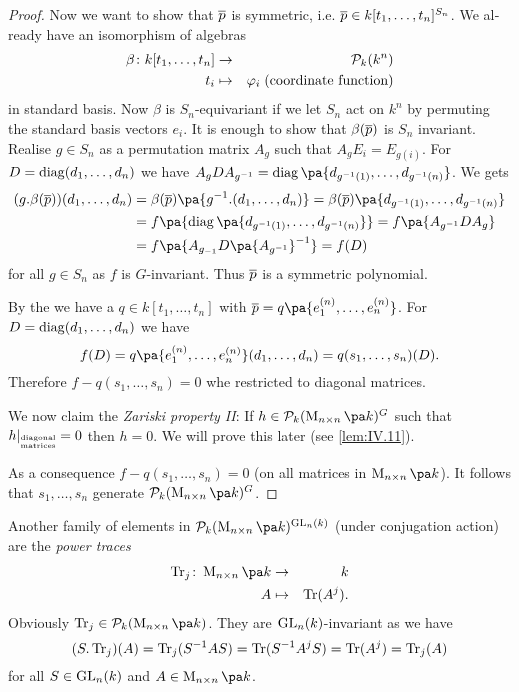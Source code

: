 \documentclass[12pt,a4paper]{scrartcl}
\theoremstyle{cplain}
\theoremstyle{cplain}
\theoremstyle{cplain}
\theoremstyle{definition}
\begin{document}
\begin{otherlanguage}{english}
\begin{proof}
  Now we want to show that $\overline p$ is symmetric, i.e. $\overline p \in k[t_1,\ldots,t_n]^{S_n}$. We already have an isomorphism of algebras
  \begin{eqnarray*}
    \beta\colon k[t_1,\ldots,t_n] &\to& \mathcal{P}_k(k^n) \\
    t_i &\mapsto& \varphi_i\;\text{(coordinate function)}
  \end{eqnarray*}
  in standard basis. Now $\beta$ is $S_n$-equivariant if we let $S_n$ act on $k^n$ by permuting the standard basis vectors $e_i$. It is enough to show that $\beta(\overline p)$ is $S_n$ invariant. Realise $g \in S_n$ as a permutation matrix $A_g$ such that $A_gE_i = E_{g(i)}$. For $D=\operatorname{diag}(d_1,\ldots,d_n)$ we have $A_gDA_{g^{-1}} = \diag\pa{d_{g^{-1}(1)},\ldots,d_{g^{-1}(n)}}$. We gets
  \begin{align*}
    (g.\beta(\ol p))(d_1,\ldots,d_n) &= \beta(\ol p)\pa{g^{-1}.(d_1,\ldots,d_n)} = \beta(\ol p)\pa{d_{g^{-1}(1)},\ldots,d_{g^{-1}(n)}} \\
    &= f\pa{\diag\pa{d_{g^{-1}(1)},\ldots,d_{g^{-1}(n)}}} = f\pa{A_{g^{-1}}DA_g} \\
    &= f\pa{A_{g_{-1}}D\pa{A_{g^{-1}}}^{-1}} = f(D)
  \end{align*}
  for all $g\in S_n$ as $f$ is $G$-invariant. Thus $\overline p$ is a symmetric polynomial.
  
  By the  we have a $q\in k[t_1,\ldots,t_n]$ with $\ol p = q\pa{e_1^{(n)},\ldots,e_n^{(n)}}$. For $D = \operatorname{diag}(d_1,\ldots,d_n)$ we have \[f(D) = q\pa{e_1^{(n)},\ldots,e_n^{(n)}}(d_1,\ldots,d_n) = q(s_1,\ldots,s_n)(D).\] Therefore $f-q(s_1,\ldots,s_n) = 0$ whe restricted to diagonal matrices.
  
  We now claim the \emph{Zariski property II}: If $h\in \Ps_k(\Mat nk)^G$ such that $h|_{\substack{\text{\tiny diagonal}\\\text{\tiny matrices}}} = 0$ then $h = 0$. We will prove this later (see \cref{lem:IV.11}).
  
  As a consequence $f - q(s_1,\ldots,s_n)  = 0$ (on all matrices in $\Mat nk$). It follows that $s_1,\ldots,s_n$ generate $\Ps_k(\Mat nk)^G$.
\end{proof}

Another family of elements in $\Ps_k(\Mat nk)^{\GL_n(k)}$ (under conjugation action) are the \emph{power traces}
\begin{eqnarray*}
  \Tr_j\colon \Mat nk &\to& k \\
  A &\mapsto& \Tr(A^j).
\end{eqnarray*}
Obviously $\Tr_j \in \Ps_k(\Mat nk)$. They are $\operatorname{GL}_n(k)$-invariant as we have \[ (S.\operatorname{Tr}_j)(A) = \operatorname{Tr}_j(S^{-1}AS) = \operatorname{Tr}(S^{-1}A^jS) = \operatorname{Tr}(A^j) = \operatorname{Tr}_j(A) \] for all $S \in \operatorname{GL}_n(k)$ and $A \in \Mat nk$.


\end{otherlanguage}
\end{document}
